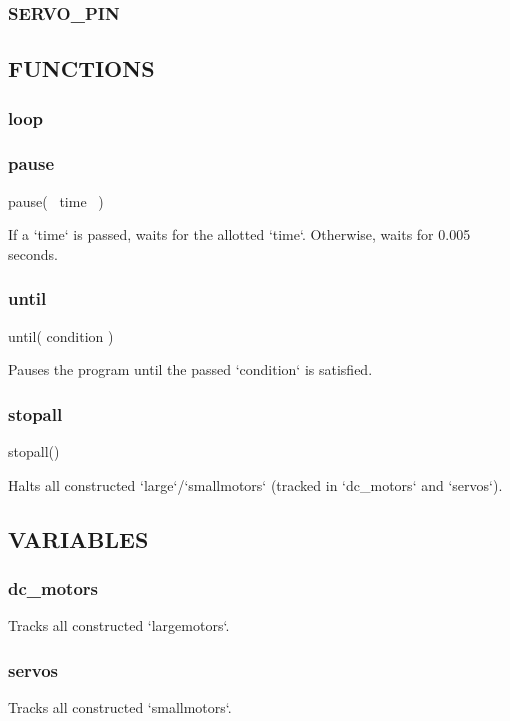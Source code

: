 \documentclass[leqno]{article}
\begin{document}
\subsubsection{SERVO\_PIN}

\subsection{FUNCTIONS}

\subsubsection{loop}

\subsubsection{pause}

    pause( ~time~ )

If a `time` is passed, waits for the allotted `time`. Otherwise, waits for
0.005 seconds.

\subsubsection{until}

    until( condition )

Pauses the program until the passed `condition` is satisfied.

\subsubsection{stopall}

    stopall()

Halts all constructed `large`/`smallmotors` (tracked in `dc\_motors` and
`servos`).

\subsection{VARIABLES}

\subsubsection{dc\_motors}

Tracks all constructed `largemotors`.

\subsubsection{servos}

Tracks all constructed `smallmotors`.
\end{document}
